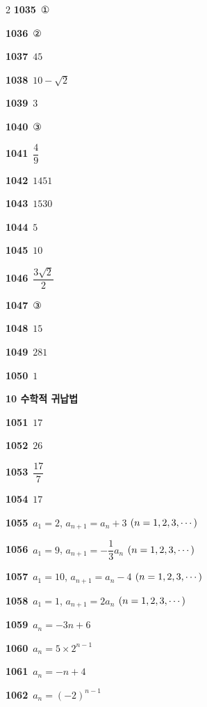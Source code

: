 \documentclass[10pt,a4paper]{article}
\begin{document}
\begin{multicols}{2}
\noindent\textbf{1035}\ ①\par
\noindent\textbf{1036}\ ②\par
\noindent\textbf{1037}\ $45$\par
\noindent\textbf{1038}\ $10-\sqrt{2}$\par
\noindent\textbf{1039}\ $3$\par
\noindent\textbf{1040}\ ③\par
\noindent\textbf{1041}\ $\dfrac{4}{9}$\par
\noindent\textbf{1042}\ $1451$\par
\noindent\textbf{1043}\ $1530$\par
\noindent\textbf{1044}\ $5$\par
\noindent\textbf{1045}\ $10$\par
\noindent\textbf{1046}\ $\dfrac{3\sqrt{2}}{2}$\par
\noindent\textbf{1047}\ ③\par
\noindent\textbf{1048}\ $15$\par
\noindent\textbf{1049}\ $281$\par
\noindent\textbf{1050}\ $1$\par
\noindent\textbf{10 수학적 귀납법}\par\smallskip
\noindent\textbf{1051}\ $17$\par
\noindent\textbf{1052}\ $26$\par
\noindent\textbf{1053}\ $\dfrac{17}{7}$\par
\noindent\textbf{1054}\ $17$\par
\noindent\textbf{1055}\ $a_1=2$, $a_{n+1}=a_n+3$ $(n=1{,}\mkern3mu\mathopen{}2{,}\mkern3mu\mathopen{}3{,}\mkern3mu\mathopen{}\cdots)$\par
\noindent\textbf{1056}\ $a_1=9$, $a_{n+1}=-\dfrac{1}{3}a_n$ $(n=1{,}\mkern3mu\mathopen{}2{,}\mkern3mu\mathopen{}3{,}\mkern3mu\mathopen{}\cdots)$\par
\noindent\textbf{1057}\ $a_1=10$, $a_{n+1}=a_n-4$ $(n=1{,}\mkern3mu\mathopen{}2{,}\mkern3mu\mathopen{}3{,}\mkern3mu\mathopen{}\cdots)$\par
\noindent\textbf{1058}\ $a_1=1$, $a_{n+1}=2a_n$ $(n=1{,}\mkern3mu\mathopen{}2{,}\mkern3mu\mathopen{}3{,}\mkern3mu\mathopen{}\cdots)$\par
\noindent\textbf{1059}\ $a_n=-3n+6$\par
\noindent\textbf{1060}\ $a_n=5\times 2^{n-1}$\par
\noindent\textbf{1061}\ $a_n=-n+4$\par
\noindent\textbf{1062}\ $a_n=(-2)^{n-1}$\par

\end{multicols}
\end{document}

